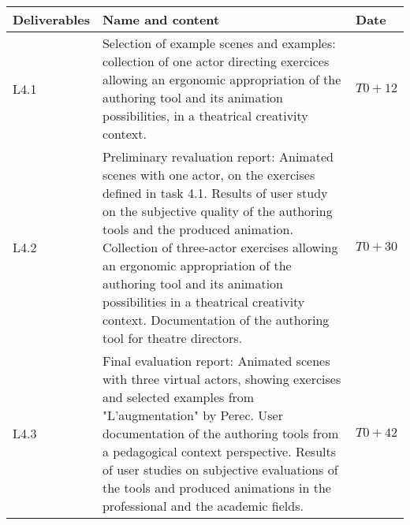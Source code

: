 \begin{tabular}{|l|p{10cm}|l|}\hline
Deliverables & Name and content  & Date  \\\hline
L4.1  & Selection of example scenes and examples: collection of  one actor directing exercices allowing an ergonomic appropriation of the authoring tool and its animation possibilities, in a theatrical creativity context.   & $T0+12$ \\\hline
L4.2  & Preliminary revaluation report: Animated scenes with one actor, on the exercises defined in task 4.1. Results of user study on the subjective quality of the authoring tools and the produced animation.  Collection of  three-actor exercises allowing an ergonomic appropriation of the authoring tool and its animation possibilities in a theatrical creativity context. Documentation of  the authoring tool for theatre directors.  & $T0+30$ \\\hline
L4.3  & Final evaluation report: Animated scenes with three virtual actors, showing exercises and selected examples from "L'augmentation" by Perec. User documentation of the authoring tools from a pedagogical context perspective. Results of user studies on subjective evaluations of the tools and produced animations in the  professional and the academic fields. & $T0+42$ \\\hline
\end{tabular}

\endinput

